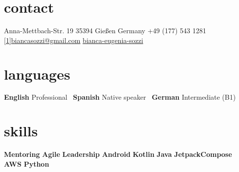 \documentclass[a4paper,nocolors]{friggeri-cv}
\begin{document}


\begin{aside} %
\section{contact}
\pin \hfill Anna-Mettbach-Str. 19
35394 Gießen
Germany\vspace{0.5em}
{\Large\textcolor{gray}{\Mobilefone}} \hfill +49 (177) 543 1281
\hfill \href{mailto:biancasozzi@gmail.com}{\scalebox{0.9}[1]{biancasozzi@gmail.com}}\vspace{0.75em}
\llogo \hfill \href{https://www.linkedin.com/in/bianca-eugenia-sozzi}{bianca-eugenia-sozzi}\vspace{2em}
~
\section{languages}
\textbf{English} \hfill Professional~
\textbf{Spanish} \hfill Native speaker~
\textbf{German} \hfill Intermediate (B1)~\vspace{2em}
\section{skills}
\textbf{Mentoring} \hfill \filleddot \filleddot \filleddot \filleddot \emptydot
\textbf{Agile} \hfill \filleddot \filleddot \filleddot \filleddot \filleddot
\textbf{Leadership} \hfill \filleddot \filleddot \filleddot \emptydot \emptydot
\textbf{Android} \hfill \filleddot \filleddot \filleddot \emptydot \emptydot
\textbf{Kotlin} \hfill \filleddot \filleddot \filleddot \emptydot \emptydot
\textbf{Java} \hfill \filleddot \filleddot \filleddot \emptydot \emptydot
\textbf{JetpackCompose} \hfill \filleddot \filleddot \emptydot \emptydot \emptydot
\textbf{AWS} \hfill \filleddot \filleddot \emptydot \emptydot \emptydot
\textbf{Python} \hfill \filleddot \filleddot \emptydot \emptydot \emptydot
\end{aside}
\end{document}

